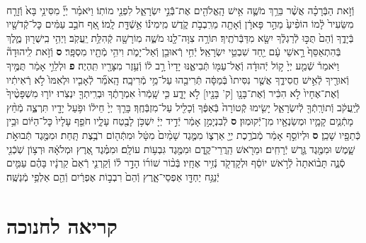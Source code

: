 \documentclass[twoside, openany, parskip=half, 11pt]{book}
\begin{document}
\begin{footnotesize}
\begin{multicols}{2}
\\
וְֿזֹ֣את הַבְּֿרָכָ֗ה אֲשֶׁ֨ר בֵּרַ֥ךְ מֹשֶׁ֛ה אִ֥ישׁ הָֽאֱלֹהִ֖ים אֶת־בְּֿֿנֵ֣י יִשְׂרָאֵ֑ל לִפְנֵ֖י מוֹתֽוֹ׃ וַיֹּאמַ֗ר יְיָ֞ מִסִּינַ֥י בָּא֙ וְֿזָרַ֤ח מִשֵּׂעִיר֙ לָ֔מוֹ הוֹפִ֨יעַ֙ מֵהַ֣ר פָּארָ֔ן וְֿאָתָ֖ה מֵרִֽבְבֹ֣ת קֹ֑דֶשׁ מִֽימִינ֕וֹ אֵ֥שְֿׁדָּ֖ת לָֽמוֹ׃ אַ֚ף חֹבֵ֣ב עַמִּ֔ים כׇּל־קְֿדֹשָׁ֖יו בְּֿיָדֶ֑ךָ וְֿהֵם֙ תֻּכּ֣וּ לְֿרַגְלֶ֔ךָ יִשָּׂ֖א מִדַּבְּֿרֹתֶֽיךָ׃ תּוֹרָ֥ה צִוָּה־לָ֖נוּ מֹשֶׁ֑ה מֽוֹרָשָׁ֖ה קְֿהִלַּ֥ת יַֽעֲקֹֽב׃ וַיְהִ֥י בִֽישֻׁר֖וּן מֶ֑לֶךְ בְּֿהִתְאַסֵּף֙ רָ֣אשֵׁי עָ֔ם יַ֖חַד שִׁבְטֵ֥י יִשְׂרָאֵֽל׃ יְֿחִ֥י רְֿאוּבֵ֖ן וְֿאַל־יָמֹ֑ת וִיהִ֥י מְֿתָ֖יו מִסְפָּֽר׃ \textbf{ס} וְֿזֹ֣את לִֽיהוּדָה֘ וַיֹּאמַר֒ שְֿׁמַ֤ע יְיָ֙ ק֣וֹל יְֿהוּדָ֔ה וְֿאֶל־עַמּ֖וֹ תְּֿבִיאֶ֑נּוּ יָדָיו֙ רָ֣ב ל֔וֹ וְֿעֵ֥זֶר מִצָּרָ֖יו תִּֽהְיֶה׃ \textbf{פ}
וּלְלֵוִ֣י אָמַ֔ר תֻּמֶּ֥יךָ וְֿאוּרֶ֖יךָ לְֿאִ֣ישׁ חֲסִידֶ֑ךָ אֲשֶׁ֤ר נִסִּיתוֹ֙ בְּֿמַסָּ֔ה תְּֿרִיבֵ֖הוּ עַל־מֵ֥י מְֿרִיבָֽה׃ הָֽאֹמֵ֞ר לְֿאָבִ֤יו וּלְאִמּוֹ֙ לֹ֣א רְֿאִיתִ֔יו וְֿאֶת־אֶחָיו֙ לֹ֣א הִכִּ֔יר וְֿאֶת־בָּנָ֖ו [ק' בָּנָ֖יו] לֹ֣א יָדָ֑ע כִּ֤י שָֽׁמְֿרוּ֙ אִמְרָתֶ֔ךָ וּבְרִֽיתְךָ֖ יִנְצֹֽרוּ׃ יוֹר֤וּ מִשְׁפָּטֶ֨יךָ֙ לְֿיַֽעֲקֹ֔ב וְֿתוֹרָֽתְֿךָ֖ לְֿיִשְׂרָאֵ֑ל יָשִׂ֤ימוּ קְֿטוֹרָה֙ בְּֿאַפֶּ֔ךָ וְֿכָלִ֖יל עַל־מִזְבְּֿחֶֽךָ׃ בָּרֵ֤ךְ יְיָ֙ חֵיל֔וֹ וּפֹ֥עַל יָדָ֖יו תִּרְצֶ֑ה מְֿחַ֨ץ מָתְֿנַ֧יִם קָמָ֛יו וּמְשַׂנְאָ֖יו מִן־יְֿקוּמֽוּן׃ \textbf{ס} לְֿבִנְיָמִ֣ן אָמַ֔ר יְֿדִ֣יד יְיָ֔ יִשְׁכֹּ֥ן לָבֶ֖טַח עָלָ֑יו חֹפֵ֤ף עָלָיו֙ כׇּל־הַיּ֔וֹם וּבֵ֥ין כְּֿתֵפָ֖יו שָׁכֵֽן׃ \textbf{ס}
וּלְיוֹסֵ֣ף אָמַ֔ר מְֿבֹרֶ֥כֶת יְיָ֖ אַרְצ֑וֹ מִמֶּ֤גֶד שָׁמַ֨יִם֙ מִטָּ֔ל וּמִתְּֿה֖וֹם רֹבֶ֥צֶת תָּֽחַת׃ וּמִמֶּ֖גֶד תְּֿבוּאֹ֣ת שָׁ֑מֶשׁ וּמִמֶּ֖גֶד גֶּ֥רֶשׁ יְֿרָחִֽים׃ וּמֵרֹ֖אשׁ הַֽרֲרֵי־קֶ֑דֶם וּמִמֶּ֖גֶד גִּבְע֥וֹת עוֹלָֽם׃ וּמִמֶּ֗גֶד אֶ֚רֶץ וּמְלֹאָ֔הּ וּרְצ֥וֹן שֹֽׁכְֿנִ֖י סְֿנֶ֑ה תָּב֨וֹאתָה֙ לְֿרֹ֣אשׁ יוֹסֵ֔ף וּלְקָדְקֹ֖ד נְֿזִ֥יר אֶחָֽיו׃ בְּֿכ֨וֹר שׁוֹר֜וֹ הָדָ֣ר ל֗וֹ וְֿקַרְנֵ֤י רְֿאֵם֙ קַרְנָ֔יו בָּהֶ֗ם עַמִּ֛ים יְֿנַגַּ֥ח יַחְדָּ֖ו אַפְסֵי־אָ֑רֶץ וְֿהֵם֙ רִבְב֣וֹת אֶפְרַ֔יִם וְֿהֵ֖ם אַלְפֵ֥י מְֿנַשֶּֽׁה׃

\end{multicols}


\newcommand{\tsource}[1]{\begin{scriptsize} \textsf{(#1)} \end{scriptsize}}
\section[חנוכה]{קריאה לחנוכה}


\end{footnotesize}
\end{document}

